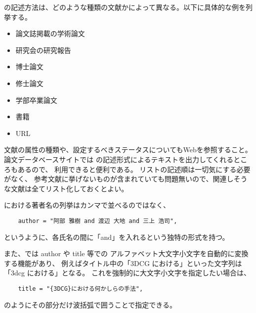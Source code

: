 \BibTeX の記述方法は、どのような種類の文献かによって異なる。以下に具体的な例を列挙する。
\begin{itemize}
 \item 論文誌掲載の学術論文\cite{abeJ}\cite{nowrouzezahrai}
 \item 研究会の研究報告\cite{aoki}
 \item 博士論文\cite{takeuchi}
 \item 修士論文\cite{abeM}
 \item 学部卒業論文\cite{abeU}
 \item 書籍\cite{dragonball}
 \item URL\cite{effekseer}
\end{itemize}

文献の属性の種類や、設定するべきステータスについてもWebを参照すること。
論文データベースサイトでは \BibTeX の記述形式によるテキストを出力してくれるところもあるので、
利用できると便利である。
リストの記述順は一切気にする必要がなく、
参考文献に挙げないものが含まれていても問題無いので、関連しそうな文献は全てリスト化しておくとよい。

\BibTeX における著者名の列挙はカンマで並べるのではなく、
\begin{verbatim}
    author = "阿部 雅樹 and 渡辺 大地 and 三上 浩司",
\end{verbatim}
というように、各氏名の間に「and」を入れるという独特の形式を持つ。

また、\BibTeX では author や title 等での
アルファベット大文字小文字を自動的に変換する機能があり、
例えばタイトル中の「3DCG における」といった文字列は「3dcg における」となる。
これを強制的に大文字小文字を指定したい場合は、
\begin{verbatim}
    title = "{3DCG}における何かしらの手法",
\end{verbatim}
のようにその部分だけ波括弧で囲うことで指定できる。

